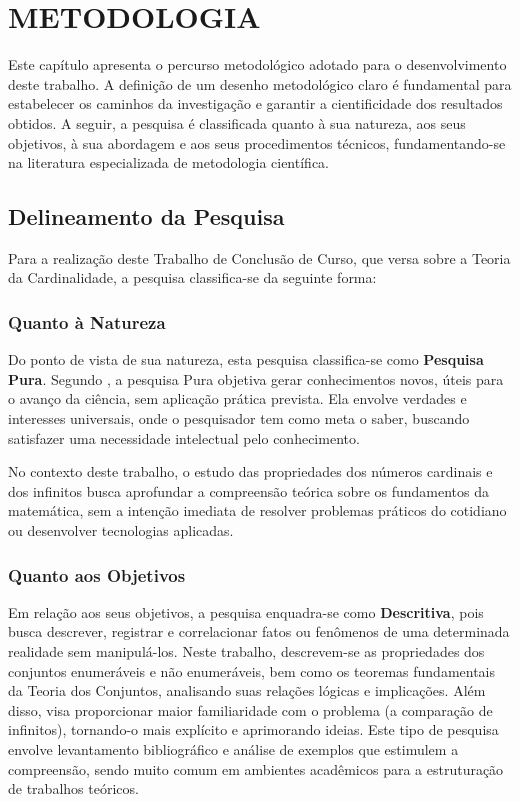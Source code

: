 
\chapter{METODOLOGIA}
\label{chap:metodologia}

Este capítulo apresenta o percurso metodológico adotado para o desenvolvimento deste trabalho. A definição de um desenho metodológico claro é fundamental para estabelecer os caminhos da investigação e garantir a cientificidade dos resultados obtidos. A seguir, a pesquisa é classificada quanto à sua natureza, aos seus objetivos, à sua abordagem e aos seus procedimentos técnicos, fundamentando-se na literatura especializada de metodologia científica.

\section{Delineamento da Pesquisa}
\label{sec:delineamento}

Para a realização deste Trabalho de Conclusão de Curso, que versa sobre a Teoria da Cardinalidade, a pesquisa classifica-se da seguinte forma:

\subsection{Quanto à Natureza}

Do ponto de vista de sua natureza, esta pesquisa classifica-se como \textbf{Pesquisa Pura}. Segundo \textcite{gil2002}, a pesquisa Pura objetiva gerar conhecimentos novos, úteis para o avanço da ciência, sem aplicação prática prevista. Ela envolve verdades e interesses universais, onde o pesquisador tem como meta o saber, buscando satisfazer uma necessidade intelectual pelo conhecimento.

No contexto deste trabalho, o estudo das propriedades dos números cardinais e dos infinitos busca aprofundar a compreensão teórica sobre os fundamentos da matemática, sem a intenção imediata de resolver problemas práticos do cotidiano ou desenvolver tecnologias aplicadas.

\subsection{Quanto aos Objetivos}

Em relação aos seus objetivos, a pesquisa enquadra-se como \textbf{Descritiva}, pois busca descrever, registrar e correlacionar fatos ou fenômenos de uma determinada realidade sem manipulá-los. Neste trabalho, descrevem-se as propriedades dos conjuntos enumeráveis e não enumeráveis, bem como os teoremas fundamentais da Teoria dos Conjuntos, analisando suas relações lógicas e implicações. Além disso, visa proporcionar maior familiaridade com o problema (a comparação de infinitos), tornando-o mais explícito e aprimorando ideias. Este tipo de pesquisa envolve levantamento bibliográfico e análise de exemplos que estimulem a compreensão, sendo muito comum em ambientes acadêmicos para a estruturação de trabalhos teóricos.

